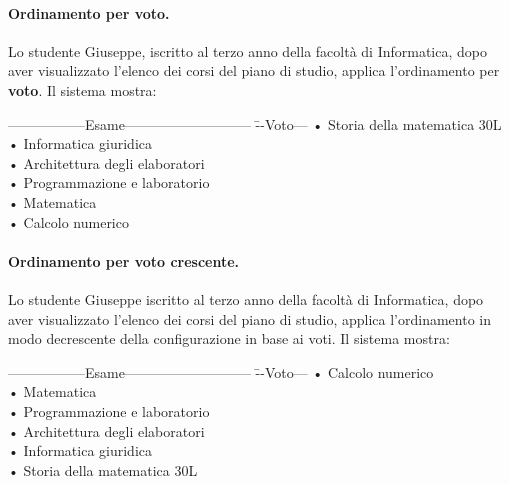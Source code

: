 \paragraph{Ordinamento per voto.}
 Lo studente Giuseppe, iscritto al terzo anno della facoltà di Informatica, dopo aver visualizzato l’elenco dei corsi del piano di studio, applica l’ordinamento per \textbf{voto}. Il sistema mostra:
 
 \begin{tabbing}
 	\hspace{1cm}-----------------Esame--------------------------- \= --Voto--- \kill
   \hspace{1cm} • Storia della matematica \> 30L \\
   \hspace{1cm} • Informatica giuridica   \\
   \hspace{1cm} • Architettura degli elaboratori   \\
   \hspace{1cm} • Programmazione e laboratorio  \\
    \hspace{1cm} • Matematica   \\
     \hspace{1cm} • Calcolo numerico   \\
 \end{tabbing}
 
\paragraph{Ordinamento per voto crescente.}
Lo studente Giuseppe iscritto al terzo anno della facoltà di Informatica, dopo aver visualizzato l'elenco dei corsi del piano di studio, applica l'ordinamento in modo decrescente della configurazione in base ai voti. Il sistema mostra:

 \begin{tabbing}
	\hspace{1cm}-----------------Esame--------------------------- \= --Voto--- \kill
	\hspace{1cm} • Calcolo numerico   \\
	\hspace{1cm} • Matematica   \\
	\hspace{1cm} • Programmazione e laboratorio  \\
	\hspace{1cm} • Architettura degli elaboratori   \\
	\hspace{1cm} • Informatica giuridica   \\
	\hspace{1cm} • Storia della matematica \> 30L \\
\end{tabbing}


